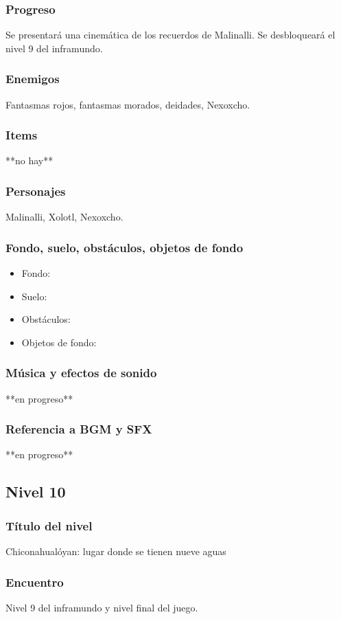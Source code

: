 \documentclass[11pt,letterpaper]{article}
\begin{document}
	\subsubsection{Progreso}
	Se presentará una cinemática de los recuerdos de Malinalli. Se desbloqueará el nivel 9 del inframundo. 
	\subsubsection{Enemigos}
	Fantasmas rojos, fantasmas morados, deidades, Nexoxcho.
	\subsubsection{Items}
	**no hay**
	\subsubsection{Personajes}
	Malinalli, Xolotl, Nexoxcho.
	\subsubsection{Fondo, suelo, obstáculos, objetos de fondo}
\begin{itemize} 
	\item Fondo:
	\item Suelo:
	\item Obstáculos:
	\item Objetos de fondo:
\end{itemize}	
	\subsubsection{Música y efectos de sonido}
	**en progreso**
	\subsubsection{Referencia a BGM y SFX}
	**en progreso**
	
	
		\subsection{Nivel 10}
	\subsubsection{Título del nivel}
	Chiconahualóyan: lugar donde se tienen nueve aguas
	\subsubsection{Encuentro}
	Nivel 9 del inframundo y nivel final del juego.
\end{document}
